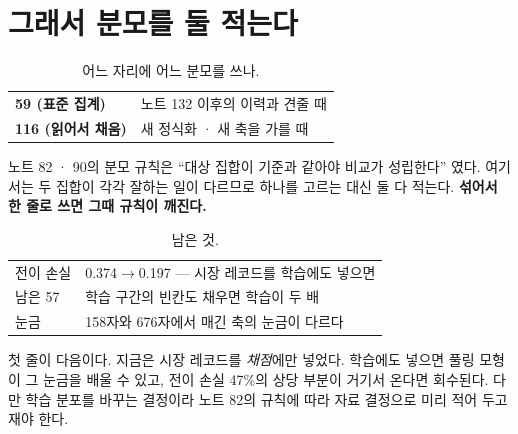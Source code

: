 \documentclass[10pt]{article}
\begin{document}

\section{그래서 분모를 둘 적는다}

\begin{table}[t]
\centering\tsize
\caption{어느 자리에 어느 분모를 쓰나.}
\begin{tabular}{ll}
\toprule
\textbf{59 (표준 집계)} & 노트 132 이후의 이력과 견줄 때 \\
\textbf{116 (읽어서 채움)} & 새 정식화 · 새 축을 가를 때 \\
\bottomrule
\end{tabular}
\end{table}

노트 82 · 90의 분모 규칙은 ``대상 집합이 기준과 같아야 비교가 성립한다''
였다. 여기서는 두 집합이 각각 잘하는 일이 다르므로 하나를 고르는 대신
둘 다 적는다. \textbf{섞어서 한 줄로 쓰면 그때 규칙이 깨진다.}

\begin{table}[t]
\centering\tsize
\caption{남은 것.}
\begin{tabular}{ll}
\toprule
전이 손실 & 0.374$\to$0.197 --- 시장 레코드를 학습에도 넣으면 \\
남은 57 & 학습 구간의 빈칸도 채우면 학습이 두 배 \\
눈금 & 158자와 676자에서 매긴 축의 눈금이 다르다 \\
\bottomrule
\end{tabular}
\end{table}

첫 줄이 다음이다. 지금은 시장 레코드를 \emph{채점}에만 넣었다. 학습에도
넣으면 풀링 모형이 그 눈금을 배울 수 있고, 전이 손실 47\%의 상당 부분이
거기서 온다면 회수된다. 다만 학습 분포를 바꾸는 결정이라 노트 82의 규칙에
따라 자료 결정으로 미리 적어 두고 재야 한다.
\end{document}
